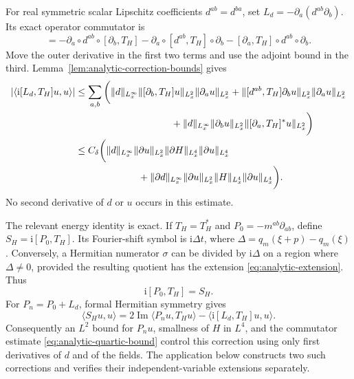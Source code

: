 \documentclass[11pt,a4paper]{article}
\numberwithin{equation}{section}
\newcommand{\ip}[2]{\langle #1,#2\rangle}
\newcommand{\ii}{\mathrm{i}}
\renewcommand{\Im}{\operatorname{Im}}
\theoremstyle{definition}
\begin{document}
For real symmetric scalar Lipschitz coefficients $d^{ab}=d^{ba}$, set
$L_d=-\partial_a(d^{ab}\partial_b)$.
Its exact operator commutator is
\begin{equation*}
[L_d,T_H]=
-\partial_a\circ d^{ab}\circ[\partial_b,T_H]
-\partial_a\circ[d^{ab},T_H]\circ\partial_b
-[\partial_a,T_H]\circ d^{ab}\circ\partial_b.
\end{equation*}
Move the outer derivative in the first two terms and use the adjoint
bound in the third. Lemma~\ref{lem:analytic-correction-bounds} gives
\begin{equation}\label{eq:analytic-quartic-bound}
\begin{aligned}
|\ip{\ii [L_d,T_H]u}{u}|
&\leq\sum_{a,b}\bigg(
 \|d\|_{L^\infty_x}\|[\partial_b,T_H]u\|_{L^2_x}\|\partial_au\|_{L^2_x}
 +\|[d^{ab},T_H]\partial_bu\|_{L^2_x}\|\partial_au\|_{L^2_x}\\
&\hspace{35mm}
 +\|d\|_{L^\infty_x}\|\partial_bu\|_{L^2_x}
                         \|[\partial_a,T_H]^*u\|_{L^2_x}\bigg)\\
&\leq C_\delta\bigg(
 \|d\|_{L^\infty_x}\|\partial u\|_{L^2_x}
                      \|\partial H\|_{L^4_x}\|\partial u\|_{L^4_x}\\
&\hspace{23mm}
 +\|\partial d\|_{L^\infty_x}\|\partial u\|_{L^2_x}
                      \|H\|_{L^4_x}\|\partial u\|_{L^4_x}\bigg).
\end{aligned}
\end{equation}
No second derivative of $d$ or $u$ occurs in this estimate.

The relevant energy identity is exact. If $T_H=T_H^*$ and
$P_0=-m^{ab}\partial_{ab}$, define $S_H=\ii [P_0,T_H]$. Its Fourier-shift
symbol is $\ii \Delta t$, where
$\Delta=q_m(\xi+p)-q_m(\xi)$. Conversely, a Hermitian numerator
$\sigma$ can be divided by $\ii \Delta$ on a region where $\Delta\ne0$,
provided the resulting quotient has the extension
\eqref{eq:analytic-extension}. Thus
\begin{equation}\label{eq:analytic-exact-correction}
\ii [P_0,T_H]=S_H.
\end{equation}
For $P_n=P_0+L_d$, formal Hermitian symmetry gives
\begin{equation}\label{eq:analytic-far-pairing}
\langle S_Hu,u\rangle
=2\Im\langle P_nu,T_Hu\rangle
-\langle \ii [L_d,T_H]u,u\rangle.
\end{equation}
Consequently an $L^2$ bound for $P_nu$, smallness of $H$ in $L^4$,
and the commutator estimate \eqref{eq:analytic-quartic-bound} control this
correction using only first derivatives of $d$ and of the fields.
The application below constructs two such corrections and verifies
their independent-variable extensions separately.
\end{document}
